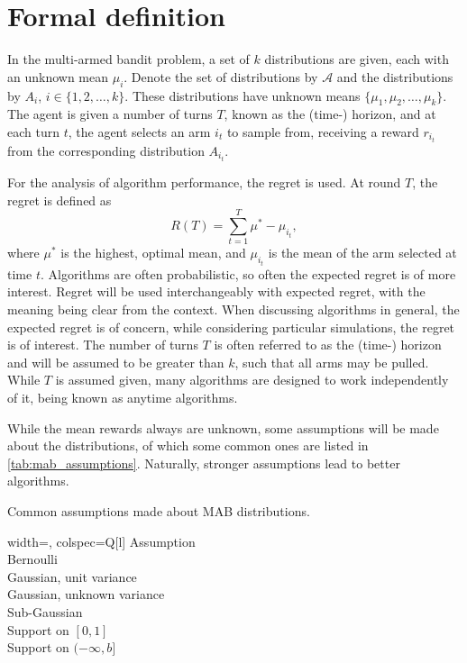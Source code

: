 \section{Formal definition}
In the multi-armed bandit problem, a set of $k$ distributions are given, each with an unknown mean $\mu_i$.
Denote the set of distributions by $\mathcal{A}$ and the distributions by $A_i$, $i \in \{1,2,\dots,k\}$.
These distributions have unknown means $\{\mu_1, \mu_2,\dots,\mu_k\}$.
The agent is given a number of turns $T$, known as the (time-) horizon, and at each turn $t$, the agent selects an arm $i_t$ to sample from, receiving a reward $r_{i_t}$ from the corresponding distribution $A_{i_t}$.

For the analysis of algorithm performance, the regret is used.
At round $T$, the regret is defined as
\begin{equation}
    R(T) = \sum_{t=1}^T \mu^* - \mu_{i_t},
\end{equation}
where $\mu^*$ is the highest, optimal mean, and $\mu_{i_t}$ is the mean of the arm selected at time $t$.
Algorithms are often probabilistic, so often the expected regret is of more interest.
Regret will be used interchangeably with expected regret, with the meaning being clear from the context.
When discussing algorithms in general, the expected regret is of concern, while considering particular simulations, the regret is of interest.
The number of turns $T$ is often referred to as the (time-) horizon and will be assumed to be greater than $k$, such that all arms may be pulled.
While $T$ is assumed given, many algorithms are designed to work independently of it, being known as anytime algorithms.

While the mean rewards always are unknown, some assumptions will be made about the distributions, of which some common ones are listed in \cref{tab:mab_assumptions}.
Naturally, stronger assumptions lead to better algorithms.

\begin{table}
    \centering
    \caption{
        Common assumptions made about MAB distributions.
    }
    \label{tab:mab_assumptions}
    \begin{tblr}{
            width=\linewidth,
            colspec={Q[l]}
        }
        \toprule
        Assumption                 \\
        \midrule
        Bernoulli                  \\
        Gaussian, unit variance    \\
        Gaussian, unknown variance \\
        Sub-Gaussian               \\
        Support on $[0,1]$         \\
        Support on $(-\infty,b]$   \\
        \bottomrule
    \end{tblr}
\end{table}



